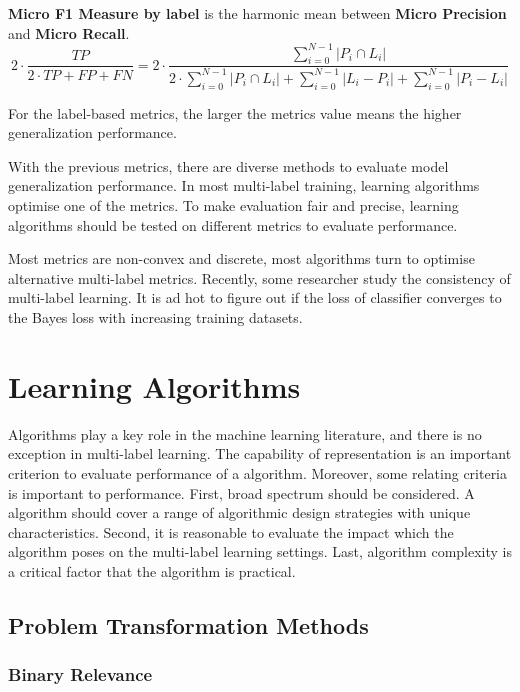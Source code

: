 \textbf{Micro F1 Measure by label} is the harmonic mean between \textbf{Micro Precision} and \textbf{Micro Recall}. 
\begin{equation}\label{eq:LabelMicroAccuracy}
2 \cdot \frac{TP}{2 \cdot TP + FP + FN}=2 \cdot \frac{\sum_{i=0}^{N-1} \left|P_i \cap L_i\right|}{2 \cdot
        \sum_{i=0}^{N-1} \left|P_i \cap L_i\right| + \sum_{i=0}^{N-1} \left|L_i - P_i\right| + \sum_{i=0}^{N-1}
        \left|P_i - L_i\right|}
\end{equation}

For the label-based metrics, the larger the metrics value means the higher generalization performance.

With the previous metrics, there are diverse methods to evaluate model generalization performance. In most multi-label training, learning algorithms optimise one of the metrics. To make evaluation fair and precise, learning algorithms should be tested on different metrics to evaluate performance.

Most metrics are non-convex and discrete, most algorithms turn to optimise alternative multi-label metrics. Recently, some researcher study the consistency of multi-label learning\citep{gao2013consistency}. It is ad hot to figure out if the loss of classifier converges to the Bayes loss with increasing training datasets.


\section{Learning Algorithms}

Algorithms play a key role in the machine learning literature, and there is no exception in multi-label learning. The capability of representation is an important criterion to evaluate performance of a algorithm. Moreover, some relating criteria is important to performance. First, broad spectrum should be considered. A algorithm should cover a range of algorithmic design strategies with unique characteristics. Second, it is reasonable to evaluate the impact which the algorithm poses on the multi-label learning settings. Last, algorithm complexity is a critical factor that the algorithm is practical.

\subsection{Problem Transformation Methods}

\subsubsection{Binary Relevance}

